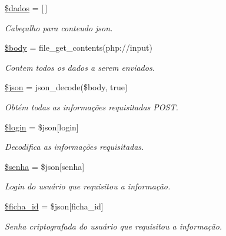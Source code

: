 \begin{DoxyCompactItemize}
\item 
\hyperlink{nao_atendidos_proximo_individual_8php_a252370d95039a38fa11afab784725d58}{\$dados} = \mbox{[}$\,$\mbox{]}
\begin{DoxyCompactList}\small\item\em Cabeçalho para conteudo json. \end{DoxyCompactList}\item 
\hyperlink{nao_atendidos_proximo_individual_8php_a26b9f9373f7bb79dfcf8a86dff086b45}{\$body} = file\+\_\+get\+\_\+contents(\textquotesingle{}php\+://input\textquotesingle{})
\begin{DoxyCompactList}\small\item\em Contem todos os dados a serem enviados. \end{DoxyCompactList}\item 
\hyperlink{nao_atendidos_proximo_individual_8php_acedd13b51401130848ce18f4d5c52605}{\$json} = json\+\_\+decode(\$body, true)
\begin{DoxyCompactList}\small\item\em Obtém todas as informações requisitadas P\+O\+ST. \end{DoxyCompactList}\item 
\hyperlink{nao_atendidos_proximo_individual_8php_afc31993e855f9631572adfedcfe6f34b}{\$login} = \$json\mbox{[}\textquotesingle{}login\textquotesingle{}\mbox{]}
\begin{DoxyCompactList}\small\item\em Decodifica as informações requisitadas. \end{DoxyCompactList}\item 
\hyperlink{nao_atendidos_proximo_individual_8php_a3678c8769c9698fd30581c1016c5f475}{\$senha} = \$json\mbox{[}\textquotesingle{}senha\textquotesingle{}\mbox{]}
\begin{DoxyCompactList}\small\item\em Login do usuário que requisitou a informação. \end{DoxyCompactList}\item 
\hyperlink{nao_atendidos_proximo_individual_8php_a6224af2851adb741887322ddb4c77102}{\$ficha\+\_\+id} = \$json\mbox{[}\textquotesingle{}ficha\+\_\+id\textquotesingle{}\mbox{]}
\begin{DoxyCompactList}\small\item\em Senha criptografada do usuário que requisitou a informação. \end{DoxyCompactList}\item 

\end{DoxyCompactItemize}
